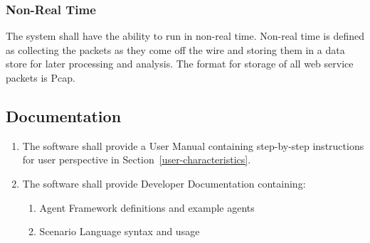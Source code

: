 \documentclass[titlepage]{article}
\begin{document}

\subsubsection{Non-Real Time}\label{nonrealtime}
The system shall have the ability to run in non-real time. Non-real time is
defined as collecting the packets as they come off the wire and storing them in
a data store for later processing and analysis.  The format for storage of all  
web service packets is Pcap.


\subsection{Documentation%
  \label{documentation}%
}
\begin{enumerate}
    \item The software shall provide a User Manual containing step-by-step instructions for user perspective in Section~\ref{user-characteristics}.
    \item The software shall provide Developer Documentation containing:
    \begin{enumerate}
        \item Agent Framework definitions and example agents
        \item Scenario Language syntax and usage
    \end{enumerate}
\end{enumerate}


\appendix
\pagebreak
\end{document}
